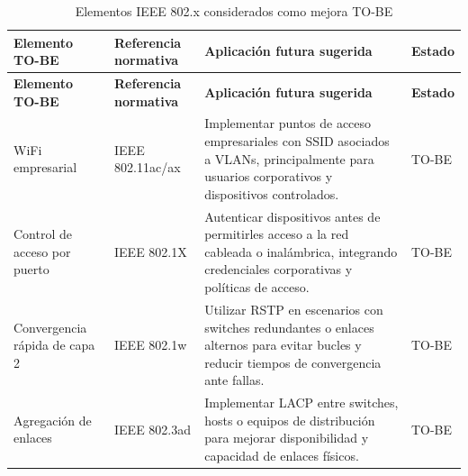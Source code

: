 \documentclass[11pt, a4paper, oneside]{report}
\begin{document}
\begin{xltabular}{\textwidth}{@{}|L{3cm}|L{3.5cm}|X|L{2cm}|@{}}
\caption{Elementos IEEE 802.x considerados como mejora TO-BE}
\label{tab:elementos_ieee_tobe} \\

\parbox[c][1.1cm][c]{\linewidth}{\centering\color{white}\bfseries\small Elemento TO-BE} &
\parbox[c][1.1cm][c]{\linewidth}{\centering\color{white}\bfseries\small Referencia normativa} &
\parbox[c][1.1cm][c]{\linewidth}{\centering\color{white}\bfseries\small Aplicación futura sugerida} &
\parbox[c][1.1cm][c]{\linewidth}{\centering\color{white}\bfseries\small Estado} \\ \hline
\endfirsthead

\parbox[c][1.1cm][c]{\linewidth}{\centering\color{white}\bfseries\small Elemento TO-BE} &
\parbox[c][1.1cm][c]{\linewidth}{\centering\color{white}\bfseries\small Referencia normativa} &
\parbox[c][1.1cm][c]{\linewidth}{\centering\color{white}\bfseries\small Aplicación futura sugerida} &
\parbox[c][1.1cm][c]{\linewidth}{\centering\color{white}\bfseries\small Estado} \\ \hline
\endhead

\hline
\endfoot

{\small WiFi empresarial} &
{\small IEEE 802.11ac/ax\newline \cite{ieee80211}} &
{\small Implementar puntos de acceso empresariales con SSID asociados a VLANs, principalmente para usuarios corporativos y dispositivos controlados.} &
{\small TO-BE} \\ \hline

{\small Control de acceso por puerto} &
{\small IEEE 802.1X} &
{\small Autenticar dispositivos antes de permitirles acceso a la red cableada o inalámbrica, integrando credenciales corporativas y políticas de acceso.} &
{\small TO-BE} \\ \hline

{\small Convergencia rápida de capa 2} &
{\small IEEE 802.1w} &
{\small Utilizar RSTP en escenarios con switches redundantes o enlaces alternos para evitar bucles y reducir tiempos de convergencia ante fallas.} &
{\small TO-BE} \\ \hline

{\small Agregación de enlaces} &
{\small IEEE 802.3ad} &
{\small Implementar LACP entre switches, hosts o equipos de distribución para mejorar disponibilidad y capacidad de enlaces físicos.} &
{\small TO-BE} \\ \hline

\end{xltabular}
\end{document}
